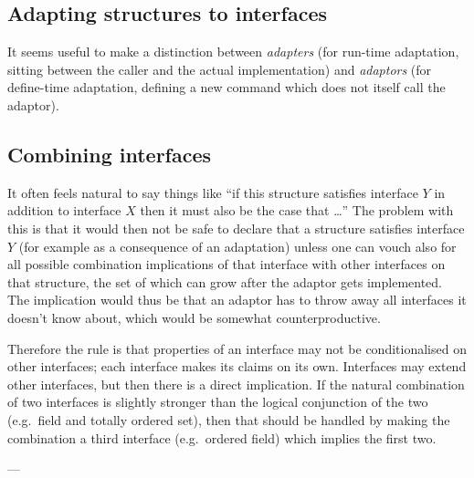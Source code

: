 \documentclass{mtmtcl}
\theoremstyle{plain}
\theoremstyle{remark}
\begin{document}
\subsection{Adapting structures to interfaces}

It seems useful to make a distinction between \emph{adapters} (for 
run-time adaptation, sitting between the caller and the actual 
implementation) and \emph{adaptors} (for define-time adaptation, 
defining a new command which does not itself call the adaptor).


\subsection{Combining interfaces}

It often feels natural to say things like ``if this structure 
satisfies interface $Y$ in addition to interface $X$ then it must 
also be the case that \dots'' The problem with this is that it would 
then not be safe to declare that a structure satisfies interface $Y$ 
(for example as a consequence of an adaptation) unless one can vouch 
also for all possible combination implications of that interface 
with other interfaces on that structure, the set of which can grow 
after the adaptor gets implemented. The implication would thus be 
that an adaptor has to throw away all interfaces it doesn't know 
about, which would be somewhat counterproductive.

Therefore the rule is that properties of an interface may not be 
conditionalised on other interfaces; each interface makes its claims 
on its own. Interfaces may extend other interfaces, but then there is 
a direct implication. If the natural combination of two interfaces is 
slightly stronger than the logical conjunction of the two (e.g.~field 
and totally ordered set), then that should be handled by making the 
combination a third interface (e.g.~ordered field) which implies the 
first two.


---


\PrintIndex
\end{document}
